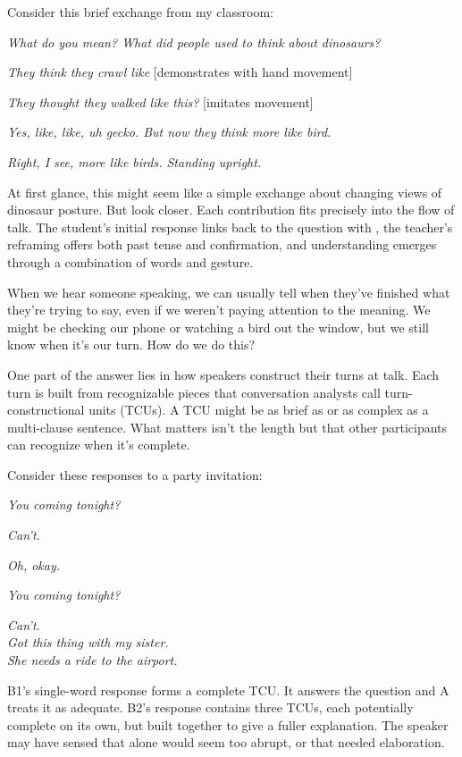 Consider this brief exchange from my classroom:

\ea
\begin{dialogue}
\item[Me] \emph{What do you mean? What did people used to think about dinosaurs?}
\item[Student] \emph{They think they crawl like} [demonstrates with hand movement]
\item[Me] \emph{They thought they walked like this?} [imitates movement]
\item[Student] \emph{Yes, like, like, uh gecko. But now they think more like bird.}
\item[Me] \emph{Right, I see, more like birds. Standing upright.}
\end{dialogue}
\z
At first glance, this might seem like a simple exchange about changing views of dinosaur posture. But look closer. Each contribution fits precisely into the flow of talk. The student's initial response links back to the question with , the teacher's reframing offers both past tense and confirmation, and understanding emerges through a combination of words and gesture.

When we hear someone speaking, we can usually tell when they've finished what they're trying to say, even if we weren't paying attention to the meaning. We might be checking our phone or watching a bird out the window, but we still know when it's our turn. How do we do this?

One part of the answer lies in how speakers construct their turns at talk. Each turn is built from recognizable pieces that conversation analysts call turn-constructional units (TCUs). A TCU might be as brief as  or as complex as a multi-clause sentence. What matters isn't the length but that other participants can recognize when it's complete.

Consider these responses to a party invitation:

\ea
    \ea
    \begin{dialogue}
    \item[A] \emph{You coming tonight?}
    \item[B1] \emph{Can't.}
    \item[A] \emph{Oh, okay.}
    \end{dialogue}
    \ex
    \begin{dialogue}
    \item[A] \emph{You coming tonight?}
    \item[B2] \emph{Can't.} \\
       \emph{Got this thing with my sister.} \\
       \emph{She needs a ride to the airport.}
    \end{dialogue}
    \z
\z
B1's single-word response forms a complete TCU. It answers the question and A treats it as adequate. B2's response contains three TCUs, each potentially complete on its own, but built together to give a fuller explanation. The speaker may have sensed that  alone would seem too abrupt, or that  needed elaboration.

